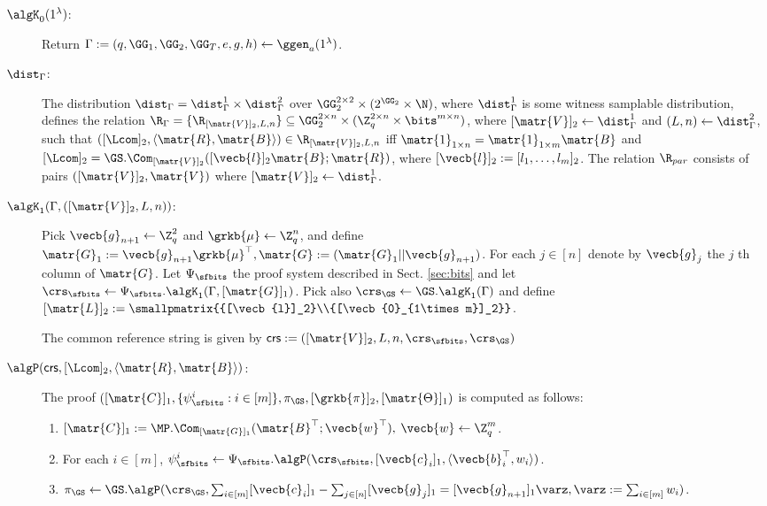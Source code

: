 \begin{description}

\item[$\algK_0(1^\lambda)$:]  Return $\Gamma := (q,\GG_1,\GG_2,\GG_T,e,g,h) \leftarrow \ggen_a(1^{\lambda})$.

\item[$\dist_\Gamma$:] The distribution $\dist_\Gamma = \dist_\Gamma^1\times\dist_\Gamma^2$ over $\GG_2^{2\times 2}\times (2^{\GG_2} \times \N)$, where $\dist_\Gamma^1$ is some witness samplable distribution, defines the relation $\R_\Gamma = \{\R_{[\matr{V}]_2,L,n}\} \subseteq \GG_2^{2\times n}\times(\Z_q^{2\times n}\times\bits^{m\times n})$,
where $[\matr{V}]_2\gets\dist_\Gamma^1$ and $(L,n)\gets\dist_{\Gamma}^2$,
such that $([\Lcom]_2,\langle\matr{R}, \matr{B}\rangle)\in\R_{[\matr{V}]_2,L,n}$ iff
$\matr{1}_{1\times n}=\matr{1}_{1\times m}\matr{B}$ and $[\Lcom]_2=\GS.\Com_{[\matr{V}]_2}([\vecb{l}]_2\matr{B};\matr{R})$, where $[\vecb{l}]_2 := [l_1,\ldots,l_m]_2$. The relation $\R_{par}$ consists of pairs $([\matr{V}]_2,\matr{V})$ where $[\matr{V}]_2 \gets \dist_{\Gamma}^1$.

\item[{$\algK_1(\Gamma, ([\matr{V}]_2,L,n))$}:]
Pick $\vecb{g}_{n+1}\gets\Z_q^2$ and $\grkb{\mu}\gets\Z_q^{n}$, and define $\matr{G}_1:=\vecb{g}_{n+1}\grkb{\mu}^\top,\matr{G}:=(\matr{G}_1||\vecb{g}_{n+1})$. For each $j\in[n]$ denote by $\vecb{g}_j$ the $j$ th column of $\matr{G}$.
Let $\Psi_\sfbits$ the proof system described in Sect. \ref{sec:bits} and let $\crs_\sfbits\gets\Psi_\sfbits.\algK_1(\Gamma,[\matr{G}]_1)$.
Pick also $\crs_\GS\gets\GS.\algK_1(\Gamma)$ and define $[\matr{L}]_2:=\smallpmatrix{{[\vecb{l}]_2}\\{[\vecb{0}_{1\times m}]_2}}$.

The common reference string is given by $\mathsf{crs} := ([\matr{V}]_2,L,n,\crs_\sfbits,\crs_\GS)$

\item[{$\algP(\mathsf{crs}, [\Lcom]_2, \langle \matr{R},\matr{B}\rangle)$}:]
The proof $([\matr{C}]_1,\{\psi_\sfbits^i:i\in[m]\},\pi_\GS,[\grkb{\pi}]_2,[\matr{\Theta}]_1)$ is computed as follows:
\begin{enumerate}
\item $[\matr{C}]_1:=\MP.\Com_{[\matr{G}]_1}(\matr{B}^\top;\vecb{w}^\top),$ $\vecb{w}\gets\Z_q^m$.
\item For each $i\in[m]$, $\psi_\sfbits^i\gets\Psi_\sfbits.\algP(\crs_\sfbits,[\vecb{c}_i]_1,\langle \vecb{b}_i^\top, w_{i} \rangle)$.
\item $\pi_\GS\gets\GS.\algP(\crs_\GS,\sum_{i\in[m]}[\vecb{c}_i]_1-\sum_{j\in[n]}[\vecb{g}_j]_1=[\vecb{g}_{n+1}]_1\varz,\varz:=\sum_{i\in[m]}w_{i})$.


\end{enumerate}
\end{description}
